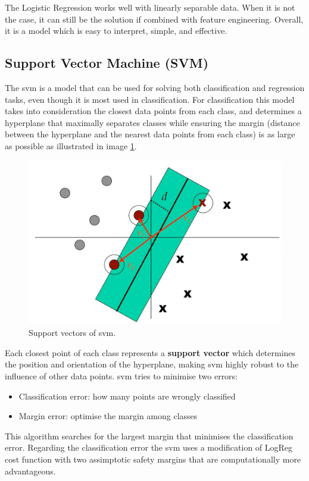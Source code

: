 The Logistic Regression works well with linearly separable data. When it is not the case, it can still be the solution if combined with feature engineering. Overall, it is a model which is easy to interpret, simple, and effective.

\subsection{Support Vector Machine (SVM)}
The \acrfull{svm} is a model that can be used for solving both classification and regression tasks, even though it is most used in classification. For classification this model takes into consideration the closest data points from each class, and determines a hyperplane that maximally separates classes while ensuring the margin (distance between the hyperplane and the nearest data points from each class) is as large as possible as illustrated in image \ref{fig:svm_supp_vectors}.
\begin{figure}[!htb]
    \centering
    \includegraphics[width=0.9\linewidth]{images/svm.png}
    \caption{Support vectors of \acrshort{svm}.}
    \label{fig:svm_supp_vectors}
\end{figure}

Each closest point of each class represents a \textbf{support vector} which determines the position and orientation of the hyperplane, making \acrshort{svm} highly robust to the influence of other data points.
\acrshort{svm} tries to minimise two errors: \begin{itemize}
    \item Classification error: how many points are wrongly classified
    \item Margin error: optimise the margin among classes
\end{itemize}
This algorithm searches for the largest margin that minimises the classification error. Regarding the classification error the \acrshort{svm} uses a modification of LogReg cost function with two assimptotic safety margins that are computationally more advantageous.


